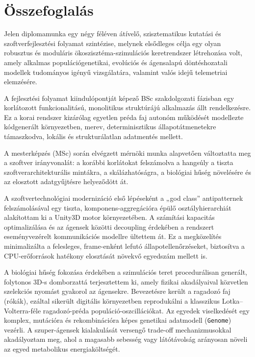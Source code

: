 \chapter{Összefoglalás}
\label{chap:osszefoglalas}

Jelen diplomamunka egy négy féléven átívelő, szisztematikus kutatási és szoftverfejlesztési folyamat szintézise, melynek elsődleges célja egy olyan robusztus és moduláris ökoszisztéma-szimulációs keretrendszer létrehozása volt, amely alkalmas populációgenetikai, evolúciós és ágensalapú döntéshozatali modellek tudományos igényű vizsgálatára, valamint valós idejű telemetriai elemzésére.

A fejlesztési folyamat kiindulópontját képező BSc szakdolgozati fázisban egy korlátozott funkcionalitású, monolitikus struktúrájú alkalmazás állt rendelkezésre. Ez a korai rendszer kizárólag egyetlen préda faj autonóm működését modellezte kódgenerált környezetben, merev, determinisztikus állapotátmenetekre támaszkodva, lokális és strukturálatlan adatmentés mellett.

A mesterképzés (MSc) során elvégzett mérnöki munka alapvetően változtatta meg a szoftver irányvonalát: a korábbi korlátokat felszámolva a hangsúly a tiszta szoftverarchitekturális mintákra, a skálázhatóságra, a biológiai hűség növelésére és az elosztott adatgyűjtésre helyeződött át.

A szoftvertechnológiai modernizáció első lépéseként a „god class” antipatternek felszámolásával egy tiszta, komponens-aggregációra épülő osztályhierarchiát alakítottam ki a Unity3D motor környezetében. A számítási kapacitás optimalizálása és az ágensek közötti decoupling érdekében a rendszert eseményvezérelt kommunikációs modellre ültettem át. Ez a megközelítés minimalizálta a felesleges, frame-enként lefutó állapotellenőrzéseket, biztosítva a CPU-erőforrások hatékony elosztását növekvő egyedszám mellett is.

A biológiai hűség fokozása érdekében a szimulációs teret procedurálisan generált, folytonos 3D-s domborzattá terjesztettem ki, amely fizikai akadályaival közvetlen szelekciós nyomást gyakorol az ágensekre. Bevezetésre került a ragadozó faj (rókák), ezáltal sikerült digitális környezetben reprodukálni a klasszikus Lotka–Volterra-féle ragadozó-préda populáció-oszcillációkat. Az egyedek viselkedését egy komplex, mutációra és rekombinációra képes genetikai adatmodell (\texttt{Genome}) vezérli. A szuper-ágensek kialakulását versengő trade-off mechanizmusokkal akadályoztam meg, ahol a magasabb sebesség vagy látótávolság arányosan növeli az egyed metabolikus energiaköltségét.

